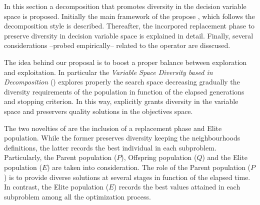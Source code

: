 In this section a decomposition \MOEA{} that promotes diversity in the decision variable space is proposed.
%
Initially the main framework of the propose \MOEA{}, which follows the decomposition \MOEAS{} style is described.
%
Thereafter, the incorpored replacement phase to preserve diversity in decision variable space is explained in detail.
%
Finally, several considerations --probed empirically-- related to the \DE{} operator are disscused.
%


The idea behind our proposal is to boost a proper balance between exploration and exploitation.
%
In particular the \textit{Variable Space Diversity \MOEA{} based in Decomposition} (\VSDMOEAD{}) explores properly the search space decreasing gradually the diversity requirements of the population in function of the elapsed generations and stopping criterion.
%
In this way, \VSDMOEAD{} explicitly grants diversity in the variable space and preservers quality solutions in the objectives space.
%

The two novelties of \VSDMOEAD{} are the inclusion of a replacement phase and Elite population.
%
While the former preserves diversity keeping the neighbourhoods definitions, the latter records the best individual in each subproblem.
%
Particularly, the Parent population ($P$), Offspring population ($Q$) and the Elite population ($E$) are taken into consideration.
%
%
The role of the Parent population ($P$) is to provide diverse solutions at several stages in function of the elapsed time.
%
In contrast, the Elite population ($E$) records the best values attained in each subproblem among all the optimization process.
%


